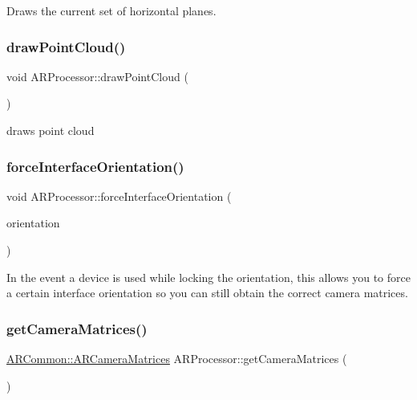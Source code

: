 Draws the current set of horizontal planes. 

\mbox{\label{class_a_r_processor_ae938bf188d56d8b30b141b2fa23e96f8}} 
\subsubsection{\texorpdfstring{draw\+Point\+Cloud()}{drawPointCloud()}}
{\footnotesize\ttfamily void A\+R\+Processor\+::draw\+Point\+Cloud (\begin{DoxyParamCaption}{ }\end{DoxyParamCaption})}



draws point cloud 

\mbox{\label{class_a_r_processor_a1100d09ed407ae8d1f4e95a9698e548d}} 
\subsubsection{\texorpdfstring{force\+Interface\+Orientation()}{forceInterfaceOrientation()}}
{\footnotesize\ttfamily void A\+R\+Processor\+::force\+Interface\+Orientation (\begin{DoxyParamCaption}\item[{U\+I\+Interface\+Orientation}]{orientation }\end{DoxyParamCaption})}

In the event a device is used while locking the orientation, this allows you to force a certain interface orientation so you can still obtain the correct camera matrices. \mbox{\label{class_a_r_processor_a82a9b334360ebccd844e7cf5584eff8b}} 
\subsubsection{\texorpdfstring{get\+Camera\+Matrices()}{getCameraMatrices()}}
{\footnotesize\ttfamily \hyperlink{struct_a_r_common_1_1_a_r_camera_matrices}{A\+R\+Common\+::\+A\+R\+Camera\+Matrices} A\+R\+Processor\+::get\+Camera\+Matrices (\begin{DoxyParamCaption}{ }\end{DoxyParamCaption})}



